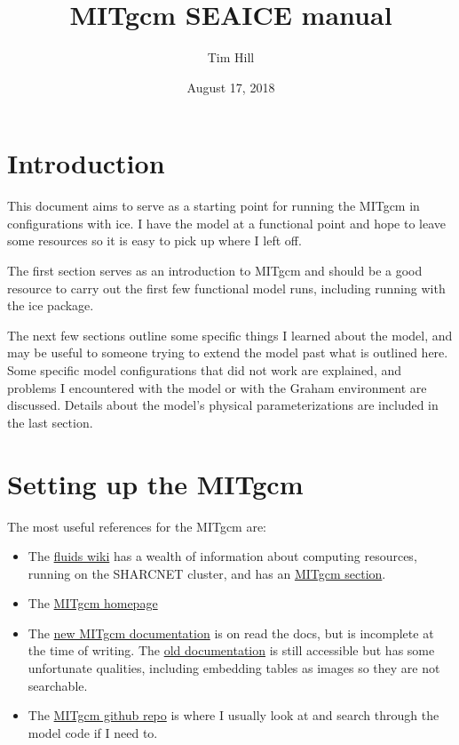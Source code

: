 \documentclass[11pt]{article}
\title{MITgcm SEAICE manual}
\author{Tim Hill}
\date{August 17, 2018}
\begin{document}
\maketitle

\tableofcontents{}

\pagebreak

\section{Introduction}

This document aims to serve as a starting point for running the MITgcm in configurations with ice. I have the model at a functional point and hope to leave some resources so it is easy to pick up where I left off.

The first section serves as an introduction to MITgcm and should be a good resource to carry out the first few functional model runs, including running with the ice package.

The next few sections outline some specific things I learned about the model, and may be useful to someone trying to extend the model past what is outlined here. Some specific model configurations that did not work are explained, and problems I encountered with the model or with the Graham environment are discussed. Details about the model's physical parameterizations are included in the last section.

\section{Setting up the MITgcm}
The most useful references for the MITgcm are:
\begin{itemize}
\item{The \href{https://wiki.math.uwaterloo.ca/fluidswiki/index.php?title=Main_Page}{fluids wiki} has a wealth of information about computing resources, running on the SHARCNET cluster, and has an \href{https://wiki.math.uwaterloo.ca/fluidswiki/index.php?title=MITgcm}{MITgcm section}.}
\item{The \href{http://mitgcm.org}{MITgcm homepage}}
\item{The \href{https://mitgcm.readthedocs.io/en/latest/}{new MITgcm documentation} is on read the docs, but is incomplete at the time of writing. The \href{http://mitgcm.org/public/r2_manual/final/online_documents/node1.html}{old documentation} is still accessible but has some unfortunate qualities, including embedding tables as images so they are not searchable.}
\item{The \href{https://github.com/MITgcm/MITgcm}{MITgcm github repo} is where I usually look at and search through the model code if I need to.}
\end{itemize}
\end{document}
